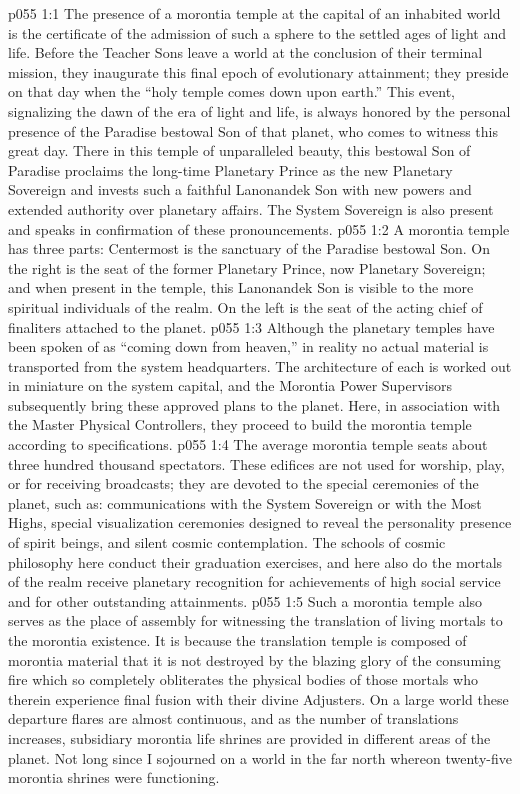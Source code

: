 \vs p055 1:1 The presence of a morontia temple at the capital of an inhabited world is the certificate of the admission of such a sphere to the settled ages of light and life. Before the Teacher Sons leave a world at the conclusion of their terminal mission, they inaugurate this final epoch of evolutionary attainment; they preside on that day when the “holy temple comes down upon earth.” This event, signalizing the dawn of the era of light and life, is always honored by the personal presence of the Paradise bestowal Son of that planet, who comes to witness this great day. There in this temple of unparalleled beauty, this bestowal Son of Paradise proclaims the long\hyp{}time Planetary Prince as the new Planetary Sovereign and invests such a faithful Lanonandek Son with new powers and extended authority over planetary affairs. The System Sovereign is also present and speaks in confirmation of these pronouncements.\plusone
\vs p055 1:2 A morontia temple has three parts: Centermost is the sanctuary of the Paradise bestowal Son. On the right is the seat of the former Planetary Prince, now Planetary Sovereign; and when present in the temple, this Lanonandek Son is visible to the more spiritual individuals of the realm. On the left is the seat of the acting chief of finaliters attached to the planet.
\pc \vs p055 1:3 Although the planetary temples have been spoken of as “coming down from heaven,” in reality no actual material is transported from the system headquarters. The architecture of each is worked out in miniature on the system capital, and the Morontia Power Supervisors subsequently bring these approved plans to the planet. Here, in association with the Master Physical Controllers, they proceed to build the morontia temple according to specifications.
\pc \vs p055 1:4 The average morontia temple seats about three hundred thousand spectators. These edifices are not used for worship, play, or for receiving broadcasts; they are devoted to the special ceremonies of the planet, such as: communications with the System Sovereign or with the Most Highs, special visualization ceremonies designed to reveal the personality presence of spirit beings, and silent cosmic contemplation. The schools of cosmic philosophy here conduct their graduation exercises, and here also do the mortals of the realm receive planetary recognition for achievements of high social service and for other outstanding attainments.
\vs p055 1:5 Such a morontia temple also serves as the place of assembly for witnessing the translation of living mortals to the morontia existence. It is because the translation temple is composed of morontia material that it is not destroyed by the blazing glory of the consuming fire which so completely obliterates the physical bodies of those mortals who therein experience final fusion with their divine Adjusters. On a large world these departure flares are almost continuous, and as the number of translations increases, subsidiary morontia life shrines are provided in different areas of the planet. Not long since I sojourned on a world in the far north whereon twenty\hyp{}five morontia shrines were functioning.
